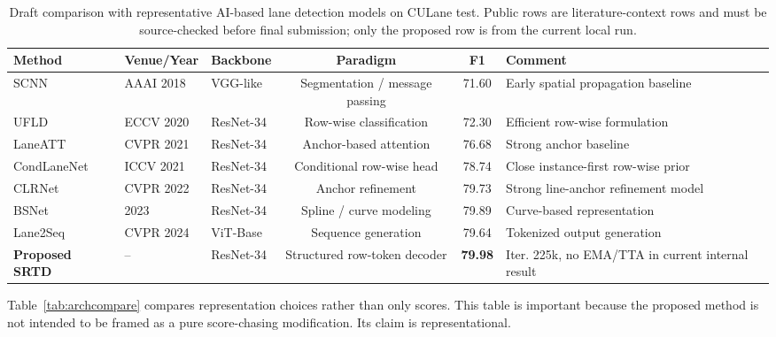 \documentclass[conference]{IEEEtran}
\newcommand{\method}{SRTD}
\begin{document}
\begin{table}[t]
\centering
\caption{Draft comparison with representative AI-based lane detection models on CULane test. Public rows are literature-context rows and must be source-checked before final submission; only the proposed row is from the current local run.}
\label{tab:public}
\begin{tabular}{lllccl}
\toprule
Method & Venue/Year & Backbone & Paradigm & F1 & Comment \\
\midrule
SCNN & AAAI 2018 & VGG-like & Segmentation / message passing & 71.60 & Early spatial propagation baseline \\
UFLD & ECCV 2020 & ResNet-34 & Row-wise classification & 72.30 & Efficient row-wise formulation \\
LaneATT & CVPR 2021 & ResNet-34 & Anchor-based attention & 76.68 & Strong anchor baseline \\
CondLaneNet & ICCV 2021 & ResNet-34 & Conditional row-wise head & 78.74 & Close instance-first row-wise prior \\
CLRNet & CVPR 2022 & ResNet-34 & Anchor refinement & 79.73 & Strong line-anchor refinement model \\
BSNet & 2023 & ResNet-34 & Spline / curve modeling & 79.89 & Curve-based representation \\
Lane2Seq & CVPR 2024 & ViT-Base & Sequence generation & 79.64 & Tokenized output generation \\
\textbf{Proposed \method} & -- & ResNet-34 & Structured row-token decoder & \textbf{79.98} & Iter. 225k, no EMA/TTA in current internal result \\
\bottomrule
\end{tabular}
\end{table}

Table~\ref{tab:archcompare} compares representation choices rather than only scores. This table is important because the proposed method is not intended to be framed as a pure score-chasing modification. Its claim is representational.
\end{document}
